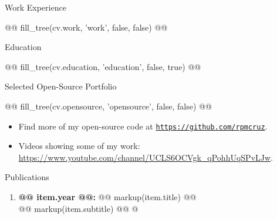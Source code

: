 \documentclass[11pt]{article}
\begin{document}
\begin{minipage}[t]{0.55\textwidth}
\setlength{\parskip}{1em}
\centerline{\sc\large Work Experience}

@@ fill_tree(cv.work, 'work', false, false) @@
\end{minipage}
%
\hfill\raisebox{-0.47\textheight}{\rule{0.5pt}{0.48\textheight}}\hfill%
%
\begin{minipage}[t]{0.40\textwidth}
\setlength{\parskip}{1em}
\centerline{\sc\large Education}

@@ fill_tree(cv.education, 'education', false, true) @@
\end{minipage}


\newpage
\centerline{\sc\large Selected Open-Source Portfolio}

\begin{multicols}{2}
\setlength{\columnseprule}{0.4pt}
@@ fill_tree(cv.opensource, 'opensource', false, false) @@
\end{multicols}

\begin{itemize}
\renewcommand{\labelitemi}{$\blacktriangleright$}
\item Find more of my open-source code at \href{https://github.com/rpmcruz?tab=repositories}{\tt https://github.com/rpmcruz}.
\item Videos showing some of my work: \url{https://www.youtube.com/channel/UCLS6OCVgk_qPohhUqSPvLJw}.
\end{itemize}


\newpage
\centerline{\sc\large Publications}

\begin{enumerate}
\itemsep0em
@%
\item \textbf{@@ item.year @@:} @@ markup(item.title) @@\\
@@ markup(item.subtitle) @@
@%
\end{enumerate}
\end{document}
